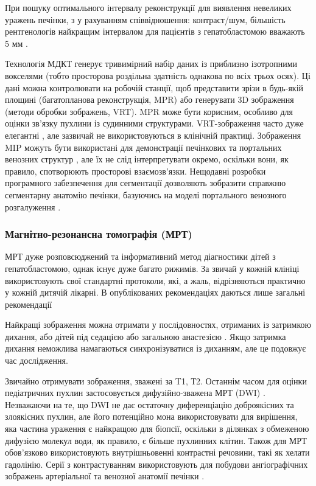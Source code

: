 При пошуку оптимального інтервалу реконструкції для виявлення невеликих уражень печінки, з у рахуванням співвідношення: контраст/шум, більшість рентгенологів  найкращим інтервалом для пацієнтів з гепатобластомою вважають 5 мм \cite{pmid17661341}.

Технологія МДКТ генерує тривимірний набір даних із приблизно ізотропними вокселями (тобто просторова роздільна здатність однакова по всіх трьох осях). Ці дані можна контролювати на робочій станції, щоб представити зрізи в будь-якій площині (багатопланова реконструкція, MPR) або генерувати 3D зображення (методи обробки зображень, VRT). MPR може бути корисним, особливо для оцінки зв'язку пухлини із судинними структурами. VRT-зображення часто дуже елегантні \cite{pmid18444949}, але зазвичай не використовуються в клінічній практиці. Зображення MIP можуть бути використані для демонстрації печінкових та портальних венозних структур \cite{pmid18560935}, але їх не слід інтерпретувати окремо, оскільки вони, як правило, спотворюють просторові взаємозв'язки. Нещодавні розробки програмного забезпечення для сегментації дозволяють зобразити справжню сегментарну анатомію печінки, базуючись на моделі портального венозного розгалуження \cite{pmid18970927}.

\subsubsection{Магнітно-резонансна томографія (МРТ)} 

МРТ дуже розповсюджений та інформативний метод діагностики дітей з гепатобластомою, однак існує дуже багато рижимів. За звичай у кожній клініці використовують свої стандартні протоколи, які, а жаль, відрізняються практично у кожній дитячій лікарні. В опублікованих рекомендаціях даються лише загальні рекомендації \cite{pmid18975296}

Найкращі зображення можна отримати у послідовностях, отриманих із затримкою дихання, або дітей під седацією або загальною анастезією \cite{pmid19040959}. Якщо затримка дихання неможлива намагаються синхронізуватися із диханням, але це подовжує час дослідження.

Звичайно отримувати зображення, зважені за T1,  Т2. Останнім часом для оцінки педіатричних пухлин застосовується дифузійно-зважена МРТ (DWI) \cite{pmid20070564}. Незважаючи на те, що DWI не дає остаточну диференціацію доброякісних та злоякісних пухлин, але його потенційно мона використовувати для вирішення, яка частина ураження є найкращою для біопсії, оскільки в ділянках з обмеженою дифузією молекул води, як правило, є більше пухлинних клітин. Також для МРТ обов’язково використовують внутрішньовенні контрастні речовини, такі як хелати гадолінію. Серії з контрастуванням використовують для побудови ангіографічних зображень артеріальної та венозної анатомії печінки \cite{pmid20223320}.


